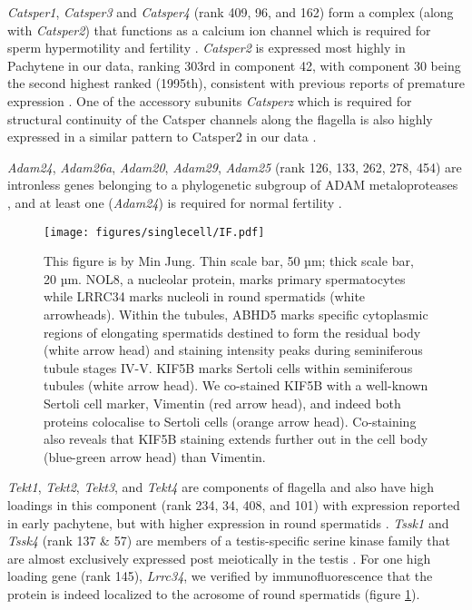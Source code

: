 \textit{Catsper1}, \textit{Catsper3} and \textit{Catsper4} (rank 409, 96, and 162) form a complex (along with \textit{Catsper2}) that functions as a calcium ion channel which is required for sperm hypermotility and fertility \parencite{Ren2001sperm, Lobley2003Identification, Qi2007All, Jin2007Catsper3}.
\textit{Catsper2} is expressed most highly in Pachytene in our data, ranking 303rd in component 42, with component 30 being the second highest ranked (1995th), consistent with previous reports of premature expression \parencite{Schultz2003multitude}.
One of the accessory subunits \textit{Catsperz} which is required for structural continuity of the Catsper channels along the flagella is also highly expressed in a similar pattern to Catsper2 in our data \parencite{Chung2017CatSperz}.

\textit{Adam24}, \textit{Adam26a}, \textit{Adam20}, \textit{Adam29}, \textit{Adam25} (rank 126, 133, 262, 278, 454) are intronless genes belonging to a phylogenetic subgroup of ADAM metaloproteases \parencite{Choi2004Characterization}, and at least one (\textit{Adam24}) is required for normal fertility \parencite{Zhu2009Testase}.


\begin{figure}[H]
	\centering
	\texttt{[image: figures/singlecell/IF.pdf]}
	\caption[Novel Immunofluorescence Markers]{
		This figure is by Min Jung.
		Thin scale bar, 50 µm; thick scale bar, 20 µm.
		NOL8, a nucleolar protein, marks primary spermatocytes while LRRC34 marks nucleoli in round spermatids (white arrowheads).
		Within the tubules, ABHD5 marks specific cytoplasmic regions of elongating spermatids destined to form the residual body (white arrow head) and staining intensity peaks during seminiferous tubule stages IV-V.
		KIF5B marks Sertoli cells within seminiferous tubules (white arrow head).
		We co-stained KIF5B with a well-known Sertoli cell marker, Vimentin (red arrow head), and indeed both proteins colocalise to Sertoli cells (orange arrow head).
		Co-staining also reveals that KIF5B staining extends further out in the cell body (blue-green arrow head) than Vimentin.
	}
	\label{fig:IF}
\end{figure}


\textit{Tekt1}, \textit{Tekt2}, \textit{Tekt3}, and \textit{Tekt4} are components of flagella \parencite{Amos2008tektin} and also have high loadings in this component (rank 234, 34, 408, and 101) with expression reported in early pachytene, but with higher expression in round spermatids \parencite{Fallahi2010Global}.
\textit{Tssk1} and \textit{Tssk4} (rank 137 \& 57) are members of a testis-specific serine kinase family that are almost exclusively expressed post meiotically in the testis \parencite{Li2011Expression}.
For one high loading gene (rank 145), \textit{Lrrc34}, we verified by immunofluorescence that the protein is indeed localized to the acrosome of round spermatids (figure \ref{fig:IF}).

